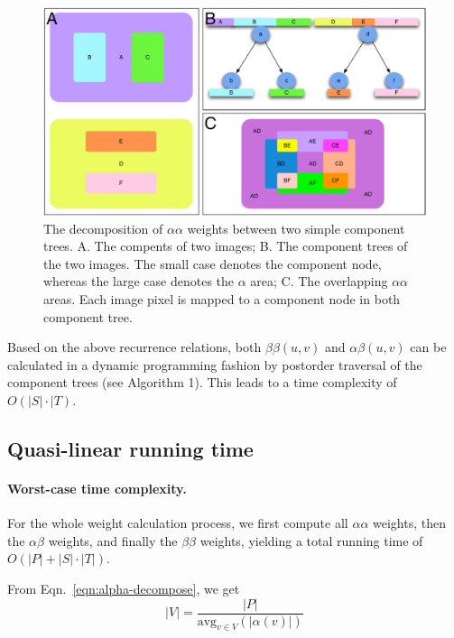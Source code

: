 \begin{figure}[htbp]
\centering
\includegraphics[width=1.0\textwidth]{images/cptree_aaweight}
\caption[The decomposition of $\alpha\alpha$ weights between two simple component
trees.]{The decomposition of $\alpha\alpha$ weights between two simple component
trees. A. The compents of two images; B. The component trees of the two images. 
The small case denotes the component node, whereas the large case denotes the $\alpha$
area; C. The overlapping $\alpha\alpha$ areas. Each image pixel is mapped to a 
component node in both component tree.}
\label{fig:cptree-aaweight}
\end{figure}

Based on the above recurrence relations, both $\beta\beta(u,v)$ and
$\alpha\beta(u,v)$ can be calculated in a dynamic programming fashion by
postorder traversal of the component trees (see Algorithm 1). This leads to a
time complexity of $O(|S| \cdot |T)$.  

\subsection{Quasi-linear running time}
\paragraph{Worst-case time complexity.} For the whole weight calculation
process, we first compute all $\alpha\alpha$ weights, then the
$\alpha\beta$ weights, and finally the $\beta\beta$ weights, yielding
a total running time of $O(|P| + |S|\cdot|T|)$.  

\def\avg{\mathrm{avg}}

From Eqn.~\eqref{eqn:alpha-decompose}, we get
\begin{equation*}
|V| = \frac{|P|}{\avg_{v\in V}(|\alpha(v)|)} 
\end{equation*}

